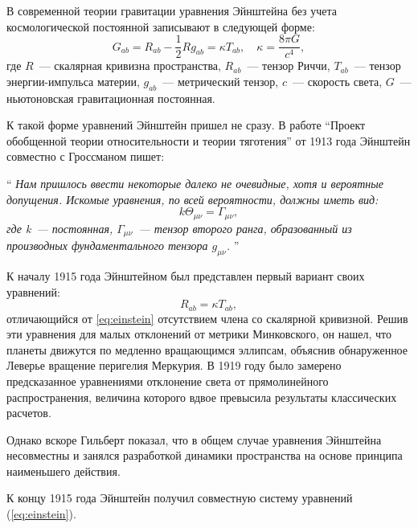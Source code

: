 \documentclass[\docroot/reports/draft/report.tex]{subfiles}
\begin{document}
    В современной теории гравитации уравнения Эйнштейна без учета космологической постоянной записывают в следующей форме:
    \begin{equation}\label{eq:einstein}
        G_{ab} = R_{ab} - \frac{1}{2} R g_{ab} = \kappa T_{ab}, \quad
        \kappa = \frac{8 \pi G}{c^4},
    \end{equation}
    где $R$~--- скалярная кривизна пространства, $R_{ab}$~--- тензор Риччи, $T_{ab}$~--- тензор энергии-импульса материи, $g_{ab}$~--- метрический тензор, $c$~--- скорость света, $G$~--- ньютоновская гравитационная постоянная.

    К такой форме уравнений Эйнштейн пришел не сразу. В работе \enquote{Проект обобщенной теории относительности и теории тяготения} \cite{einstein_grossman_grav_waves} от 1913 года Эйнштейн совместно с Гроссманом пишет:

    \enquote{\textit{%
        Нам пришлось ввести некоторые далеко не очевидные, хотя
        и вероятные допущения. Искомые уравнения, по всей вероятности, должны иметь вид:
        \begin{equation*}
            k \Theta_{\mu\nu} = \Gamma_{\mu\nu},
        \end{equation*}
        где k~--- постоянная, $\Gamma_{\mu\nu}$~--- тензор второго ранга, образованный из производных фундаментального тензора $g_{\mu\nu}$.%
    }}

    К началу 1915 года Эйнштейном был представлен первый вариант своих уравнений:
    \begin{equation*}
        R_{ab} = \kappa T_{ab},
    \end{equation*}
    отличающийся от \autoref{eq:einstein} отсутствием члена со скалярной кривизной. Решив эти уравнения для малых отклонений от метрики Минковского, он нашел, что планеты движутся по медленно вращающимся эллипсам, объяснив обнаруженное Леверье вращение перигелия Меркурия. В 1919 году было замерено предсказанное уравнениями отклонение света от прямолинейного распространения, величина которого вдвое превысила результаты классических расчетов.

    Однако вскоре Гильберт показал, что в общем случае уравнения Эйнштейна несовместны и занялся разработкой динамики пространства на основе принципа наименьшего действия.

    К концу 1915 года Эйнштейн получил совместную систему уравнений (\autoref{eq:einstein}).
\end{document}
